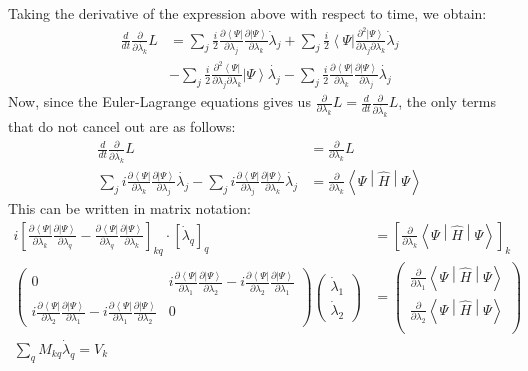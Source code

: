 \documentclass{aux/ttuthes2007}
\newcommand{\bra}[1]{\ensuremath{\left\langle#1\right\vert}}
\newcommand{\ket}[1]{\ensuremath{\left|#1\right\rangle}}
\newcommand{\sandwich}[3]{\left< #1 \middle\vert #2 \middle\vert #3 \right>}
\newcommand{\ddt}{\frac{d}{dt}}
\newcommand{\pd}[1]{\frac{\partial}{\partial #1}}
\newcommand{\kpp}[1]{\frac{\partial \ket\Psi}{\partial #1}}
\newcommand{\bpp}[1]{\frac{\partial \bra\Psi}{\partial #1}}
\newcommand{\kppd}[2]{\frac{\partial^{2} \ket\Psi}{\partial #1 \partial #2}}
\newcommand{\bppd}[2]{\frac{\partial^{2} \bra\Psi}{\partial #1 \partial #2}}
\begin{document}
%
Taking the derivative of the expression above with respect to time, we obtain:
%
\begin{equation*}
	\begin{split}
		\ddt \pd{\dot{\lambda_k}} L &=
		\sum_j \frac{i}{2}\bpp{\lambda_j}{\kpp {\lambda_k}} \dot \lambda_j
	+	\sum_j \frac{i}{2}\bra{\Psi}{\kppd {\lambda_j}{\lambda_k}} \dot \lambda_j \\
    	&- 	\sum_j \frac{i}{2}{\bppd{\lambda_j}{\lambda_k}}\ket{\Psi}\dot{\lambda_j}
	- 	\sum_j \frac{i}{2}{\bpp{\lambda_k}}\kpp{\lambda_j}\dot{\lambda_j}
	\end{split}
\end{equation*}
%
Now, since the Euler-Lagrange equations gives us $\pd{\lambda_k} L = \ddt \pd{\dot {\lambda_k}} L$, the only terms that do not cancel out are as follows:
%
\begin{equation*}
	\begin{split}
		\ddt \pd{\dot{\lambda_k}} L 
	&=	\pd{\lambda_k} L
	\\
	 	\sum_j i \bpp{\lambda_k} \kpp{\lambda_j}\dot{\lambda_j}
	-	\sum_j i \bpp{\lambda_j} \kpp{\lambda_k}\dot{\lambda_j}
	&= 	\pd{\lambda_k}\sandwich{\Psi}{\hat H}{\Psi}
	\end{split}
\end{equation*}
%
This can be written in matrix notation:
%
\begin{equation*}
	\begin{split}
	 	i \left [ \bpp{\lambda_k} \kpp{\lambda_q} 
			- \bpp{\lambda_q} \kpp{\lambda_k} \right ]_{kq}
		\cdot \left[ \dot \lambda_q \right]_q
	&= 	\left[\pd{\lambda_k}\sandwich{\Psi}{\hat H}{\Psi}\right]_k \\
	\begin{pmatrix}
		0 & i \bpp{\lambda_1} \kpp{\lambda_2} - i \bpp{\lambda_2} \kpp{\lambda_1} \\
		i \bpp{\lambda_2} \kpp{\lambda_1} - i \bpp{\lambda_1} \kpp{\lambda_2} & 0
	\end{pmatrix} 
	\begin{pmatrix}
		\dot \lambda_1 \\
		\dot \lambda_2 
	\end{pmatrix} 
	    &=
	\begin{pmatrix}
		\pd {\lambda_1} \sandwich{\Psi}{\hat H}{\Psi}\\
		\pd {\lambda_2} \sandwich{\Psi}{\hat H}{\Psi}\\
	\end{pmatrix} \\
	\sum_q M_{kq} \dot \lambda_q = V_k
	\end{split}
\end{equation*}
\end{document}
